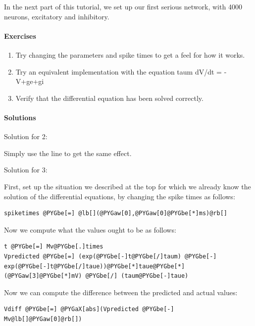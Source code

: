 \documentclass[letterpaper,10pt]{manual}
\begin{document}
In the next part of this tutorial, we set up our first serious network,
with 4000 neurons, excitatory and inhibitory.


\paragraph{Exercises}
\begin{enumerate}
\item {} 
Try changing the parameters and spike times to get a feel for how it
works.

\item {} 
Try an equivalent implementation with the equation taum dV/dt = -V+ge+gi

\item {} 
Verify that the differential equation has been solved correctly.

\end{enumerate}


\paragraph{Solutions}

Solution for 2:

Simply use the line  to get the same effect.

Solution for 3:

First, set up the situation we described at the top for which we
already know the solution of the differential equations, by changing
the spike times as follows:

\begin{Verbatim}[commandchars=@\[\]]
spiketimes @PYGbe[=] @lb[](@PYGaw[0],@PYGaw[0]@PYGbe[*]ms)@rb[]
\end{Verbatim}

Now we compute what the values ought to be as follows:

\begin{Verbatim}[commandchars=@\[\]]
t @PYGbe[=] Mv@PYGbe[.]times
Vpredicted @PYGbe[=] (exp(@PYGbe[-]t@PYGbe[/]taum) @PYGbe[-] exp(@PYGbe[-]t@PYGbe[/]taue))@PYGbe[*]taue@PYGbe[*](@PYGaw[3]@PYGbe[*]mV) @PYGbe[/] (taum@PYGbe[-]taue)
\end{Verbatim}

Now we can compute the difference between the predicted and actual values:

\begin{Verbatim}[commandchars=@\[\]]
Vdiff @PYGbe[=] @PYGaX[abs](Vpredicted @PYGbe[-] Mv@lb[]@PYGaw[0]@rb[])
\end{Verbatim}
\end{document}
